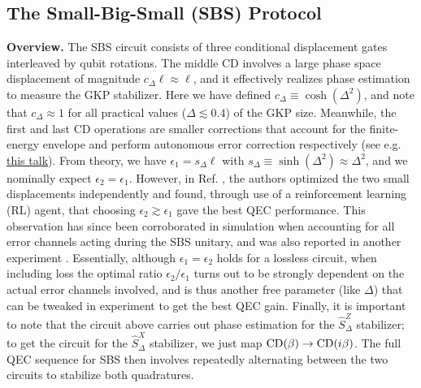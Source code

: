 \subsection{The Small-Big-Small (SBS) Protocol\label{sec:2_SBS}}
\textbf{Overview.} The SBS circuit consists of three conditional displacement gates interleaved by qubit rotations. The middle CD involves a large phase space displacement of magnitude $c_\Delta \ell \approx \ell$, and it effectively realizes phase estimation to measure the GKP stabilizer. Here we have defined $c_\Delta \equiv \cosh(\Delta^2)$, and note that $c_\Delta \approx 1$ for all practical values ($\Delta \lesssim 0.4$) of the GKP size. Meanwhile, the first and last CD operations are smaller corrections that account for the finite-energy envelope and perform autonomous error correction respectively (see e.g. \href{https://youtu.be/TOQzHkgsH_E?t=1045}{this talk}). From theory, we have $\epsilon_1 = s_\Delta \ell$ with $s_\Delta \equiv \sinh(\Delta^2) \approx \Delta^2$, and we nominally expect $\epsilon_2 = \epsilon_1$. However, in Ref. \cite{sivak2023gkp-expt}, the authors optimized the two small displacements independently and found, through use of a reinforcement learning (RL) agent, that choosing $\epsilon_2 \gtrsim \epsilon_1$ gave the best QEC performance. This observation has since been corroborated in simulation when accounting for all error channels acting during the SBS unitary, and was also reported in another experiment \cite{nordquantique2023gkp-expt}. Essentially, although $\epsilon_1 = \epsilon_2$ holds for a lossless circuit, when including loss the optimal ratio $\epsilon_2/\epsilon_1$ turns out to be strongly dependent on the actual error channels involved, and is thus another free parameter (like $\Delta$) that can be tweaked in experiment to get the best QEC gain. Finally, it is important to note that the circuit above carries out phase estimation for the $\hat{S}_\Delta^{Z}$ stabilizer; to get the circuit for the $\hat{S}_\Delta^{X}$ stabilizer, we just map ${\rm CD}(\beta) \to {\rm CD}(i\beta)$. The full QEC sequence for SBS then involves repeatedly alternating between the two circuits to stabilize both quadratures. 

